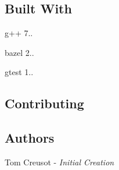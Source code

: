 \subsection*{Built With}


\begin{DoxyItemize}
\item g++ 7..
\item bazel 2..
\item gtest 1..
\end{DoxyItemize}

\subsection*{Contributing}

\subsection*{Authors}


\begin{DoxyItemize}
\item Tom Creusot -\/ {\itshape Initial Creation} 
\end{DoxyItemize}